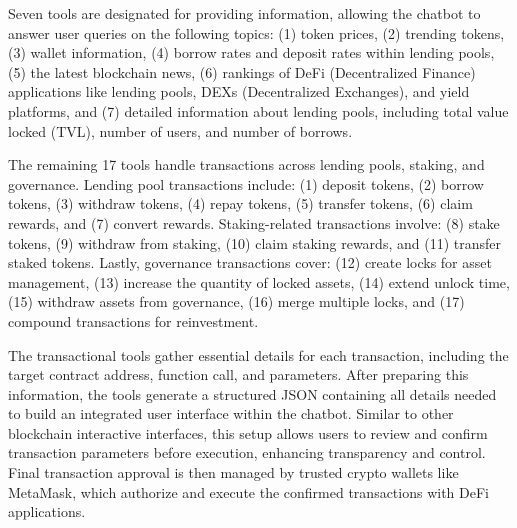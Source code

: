 \documentclass[runningheads]{llncs}
\begin{document}
Seven tools are designated for providing information, allowing the chatbot to answer user queries on the following topics: (1) token prices, (2) trending tokens, (3) wallet information, (4) borrow rates and deposit rates within lending pools, (5) the latest blockchain news, (6) rankings of DeFi (Decentralized Finance) applications like lending pools, DEXs (Decentralized Exchanges), and yield platforms, and (7) detailed information about lending pools, including total value locked (TVL), number of users, and number of borrows.


The remaining 17 tools handle transactions across lending pools, staking, and governance. Lending pool transactions include: (1) deposit tokens, (2) borrow tokens, (3) withdraw tokens, (4) repay tokens, (5) transfer tokens, (6) claim rewards, and (7) convert rewards. Staking-related transactions involve: (8) stake tokens, (9) withdraw from staking, (10) claim staking rewards, and (11) transfer staked tokens. Lastly, governance transactions cover: (12) create locks for asset management, (13) increase the quantity of locked assets, (14) extend unlock time, (15) withdraw assets from governance, (16) merge multiple locks, and (17) compound transactions for reinvestment.

The transactional tools gather essential details for each transaction, including the target contract address, function call, and parameters. After preparing this information, the tools generate a structured JSON containing all details needed to build an integrated user interface within the chatbot. Similar to other blockchain interactive interfaces, this setup allows users to review and confirm transaction parameters before execution, enhancing transparency and control. Final transaction approval is then managed by trusted crypto wallets like MetaMask, which authorize and execute the confirmed transactions with DeFi applications.
\end{document}
